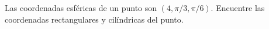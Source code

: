 \item Las coordenadas esféricas de un punto son $(4, \pi/3, \pi/6)$. Encuentre las coordenadas rectangulares y cilíndricas del punto.
